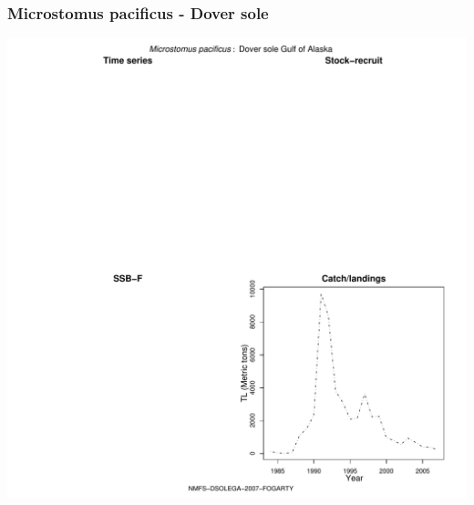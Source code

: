 \subsubsection{Microstomus pacificus - Dover sole}
\begin{center}
\includegraphics[width=1.2\textwidth]{../R/figures/NMFS-DSOLEGA-2007-FOGARTY.pdf}
\end{center}


